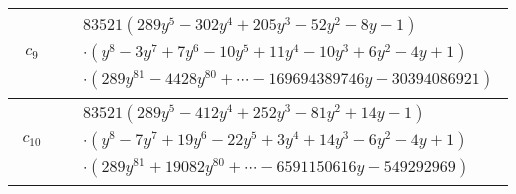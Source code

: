 \documentclass[1p]{elsarticle_modified}
\theoremstyle{definition}
\begin{document}
\begin{tabular}{m{50pt}|m{274pt}}
\hline $$\begin{aligned}c_{9}\end{aligned}$$&$\begin{aligned}
&83521(289 y^5-302 y^4+205 y^3-52 y^2-8 y-1)\\
&\cdot(y^8-3 y^7+7 y^6-10 y^5+11 y^4-10 y^3+6 y^2-4 y+1)\\
&\cdot(289 y^{81}-4428 y^{80}+\cdots-169694389746 y-30394086921)
\end{aligned}$\\
\hline $$\begin{aligned}c_{10}\end{aligned}$$&$\begin{aligned}
&83521(289 y^5-412 y^4+252 y^3-81 y^2+14 y-1)\\
&\cdot(y^8-7 y^7+19 y^6-22 y^5+3 y^4+14 y^3-6 y^2-4 y+1)\\
&\cdot(289 y^{81}+19082 y^{80}+\cdots-6591150616 y-549292969)
\end{aligned}$\\
\hline
\end{tabular}
\vskip 2pc
\end{document}
